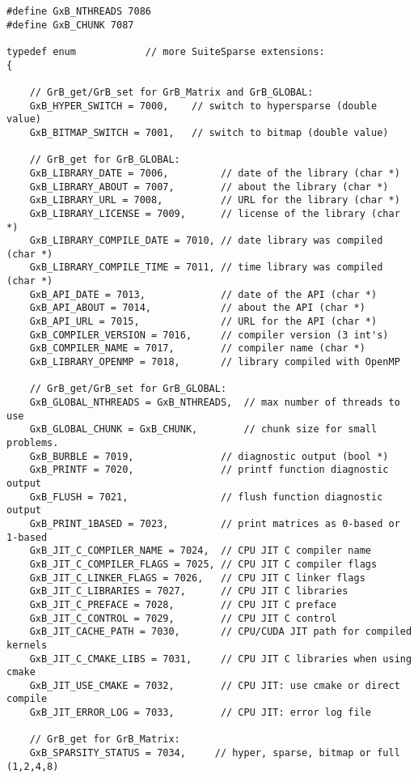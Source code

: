 {\begin{verbatim}
#define GxB_NTHREADS 7086
#define GxB_CHUNK 7087

typedef enum            // more SuiteSparse extensions:
{

    // GrB_get/GrB_set for GrB_Matrix and GrB_GLOBAL:
    GxB_HYPER_SWITCH = 7000,    // switch to hypersparse (double value)
    GxB_BITMAP_SWITCH = 7001,   // switch to bitmap (double value)

    // GrB_get for GrB_GLOBAL:
    GxB_LIBRARY_DATE = 7006,         // date of the library (char *)
    GxB_LIBRARY_ABOUT = 7007,        // about the library (char *)
    GxB_LIBRARY_URL = 7008,          // URL for the library (char *)
    GxB_LIBRARY_LICENSE = 7009,      // license of the library (char *)
    GxB_LIBRARY_COMPILE_DATE = 7010, // date library was compiled (char *)
    GxB_LIBRARY_COMPILE_TIME = 7011, // time library was compiled (char *)
    GxB_API_DATE = 7013,             // date of the API (char *)
    GxB_API_ABOUT = 7014,            // about the API (char *)
    GxB_API_URL = 7015,              // URL for the API (char *)
    GxB_COMPILER_VERSION = 7016,     // compiler version (3 int's)
    GxB_COMPILER_NAME = 7017,        // compiler name (char *)
    GxB_LIBRARY_OPENMP = 7018,       // library compiled with OpenMP

    // GrB_get/GrB_set for GrB_GLOBAL:
    GxB_GLOBAL_NTHREADS = GxB_NTHREADS,  // max number of threads to use
    GxB_GLOBAL_CHUNK = GxB_CHUNK,        // chunk size for small problems.
    GxB_BURBLE = 7019,               // diagnostic output (bool *)
    GxB_PRINTF = 7020,               // printf function diagnostic output
    GxB_FLUSH = 7021,                // flush function diagnostic output
    GxB_PRINT_1BASED = 7023,         // print matrices as 0-based or 1-based
    GxB_JIT_C_COMPILER_NAME = 7024,  // CPU JIT C compiler name
    GxB_JIT_C_COMPILER_FLAGS = 7025, // CPU JIT C compiler flags
    GxB_JIT_C_LINKER_FLAGS = 7026,   // CPU JIT C linker flags
    GxB_JIT_C_LIBRARIES = 7027,      // CPU JIT C libraries
    GxB_JIT_C_PREFACE = 7028,        // CPU JIT C preface
    GxB_JIT_C_CONTROL = 7029,        // CPU JIT C control
    GxB_JIT_CACHE_PATH = 7030,       // CPU/CUDA JIT path for compiled kernels
    GxB_JIT_C_CMAKE_LIBS = 7031,     // CPU JIT C libraries when using cmake
    GxB_JIT_USE_CMAKE = 7032,        // CPU JIT: use cmake or direct compile
    GxB_JIT_ERROR_LOG = 7033,        // CPU JIT: error log file

    // GrB_get for GrB_Matrix:
    GxB_SPARSITY_STATUS = 7034,     // hyper, sparse, bitmap or full (1,2,4,8)


\end{verbatim}}
